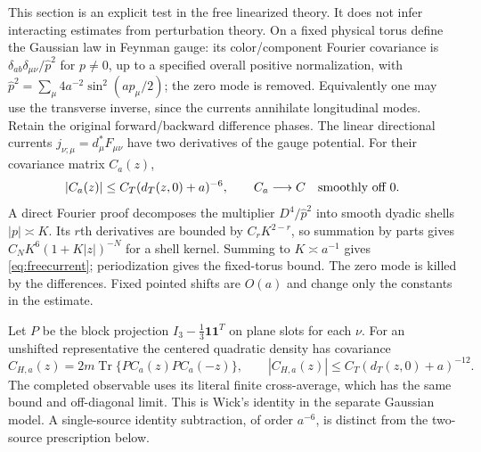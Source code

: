\documentclass[11pt,letterpaper]{article}
\theoremstyle{plain}
\theoremstyle{remark}\newtheorem{remark}[theorem]{Scope}
\DeclareMathOperator{\Tr}{Tr}\DeclareMathOperator{\Vol}{Vol}
\begin{document}
This section is an explicit test in the free linearized theory. It does not infer
interacting estimates from perturbation theory. On a fixed physical torus define
the Gaussian law in Feynman gauge: its color/component Fourier covariance is
$\delta_{ab}\delta_{\mu\nu}/\widehat p^2$ for $p\ne0$, up to a specified overall
positive normalization, with
$\widehat p^2=\sum_\mu4a^{-2}\sin^2(ap_\mu/2)$; the zero mode is removed.
Equivalently one may use the transverse inverse, since the currents annihilate
longitudinal modes. Retain the original forward/backward difference phases.
The linear directional currents
$j_{\nu;\mu}=d_\mu^*F_{\mu\nu}$ have two derivatives of the gauge potential.
For their covariance matrix $C_a(z)$,
\begin{equation}
|C_a(z)|\le C_T(d_T(z,0)+a)^{-6},
\qquad C_a\longrightarrow C\quad\hbox{smoothly off }0.
\label{eq:freecurrent}
\end{equation}
A direct Fourier proof decomposes the multiplier $D^4/\widehat p^2$ into
smooth dyadic shells $|p|\asymp K$. Its $r$th derivatives are bounded by
$C_rK^{2-r}$, so summation by parts gives
$C_NK^6(1+K|z|)^{-N}$ for a shell kernel. Summing to $K\asymp a^{-1}$ gives
\eqref{eq:freecurrent}; periodization gives the fixed-torus bound. The zero mode
is killed by the differences. Fixed pointed shifts are $O(a)$ and change only
the constants in the estimate.

Let $P$ be the block projection $I_3-\frac13\mathbf1\mathbf1^T$ on plane slots
for each $\nu$. For an unshifted representative the centered quadratic density
has covariance
\begin{equation}
C_{H,a}(z)=2m\Tr\{P C_a(z)P C_a(-z)\},
\qquad |C_{H,a}(z)|\le C_T(d_T(z,0)+a)^{-12}.
\label{eq:freeH}
\end{equation}
The completed observable uses its literal finite cross-average, which has the
same bound and off-diagonal limit. This is Wick's identity in the separate
Gaussian model. A single-source identity subtraction, of order $a^{-6}$, is
distinct from the two-source prescription below.
\end{document}
